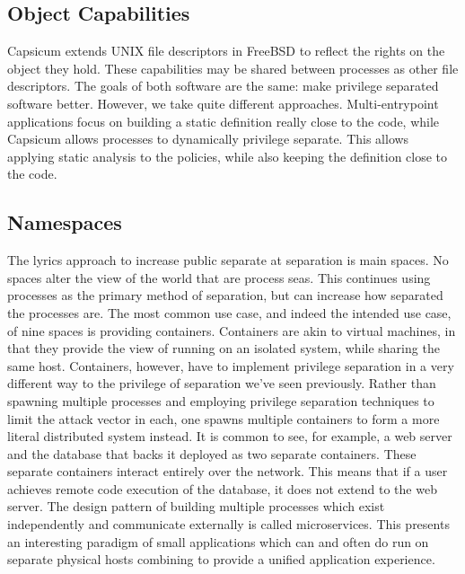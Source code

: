 \documentclass[sigplan]{acmart}
\begin{document}
\subsection{Object Capabilities}

Capsicum \citep{watson_capsicum_2010} extends UNIX file descriptors in FreeBSD to reflect the rights on the object they hold. These capabilities may be shared between processes as other file descriptors. The goals of both software are the same: make privilege separated software better. However, we take quite different approaches. Multi-entrypoint applications focus on building a static definition really close to the code, while Capsicum allows processes to dynamically privilege separate. This allows applying static analysis to the policies, while also keeping the definition close to the code.


\subsection{Namespaces}

The lyrics approach to increase public separate at separation is main spaces. No spaces alter the view of the world that are process seas. This continues using processes as the primary method of separation, but can increase how separated the processes are. The most common use case, and indeed the intended use case, of nine spaces is providing containers. Containers are akin to virtual machines, in that they provide the view of running on an isolated system, while sharing the same host. Containers, however, have to implement privilege separation in a very different way to the privilege of separation we've seen previously. Rather than spawning multiple processes and employing privilege separation techniques to limit the attack vector in each, one spawns multiple containers to form a more literal distributed system instead. It is common to see, for example, a web server and the database that backs it deployed as two separate containers. These separate containers interact entirely over the network. This means that if a user achieves remote code execution of the database, it does not extend to the web server. The design pattern of building multiple processes which exist independently and communicate externally is called microservices. This presents an interesting paradigm of small applications which can and often do run on separate physical hosts combining to provide a unified application experience.
\end{document}
